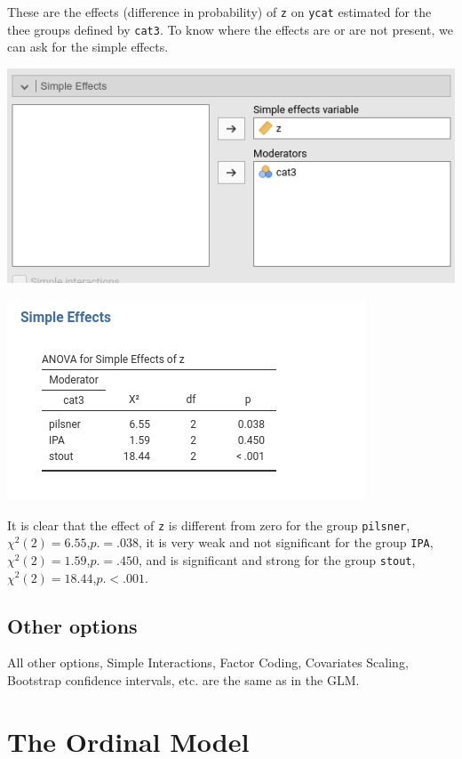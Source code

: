 \documentclass[
]{book}
\begin{document}
These are the effects (difference in probability) of \texttt{z} on \texttt{ycat} estimated for the thee groups defined by \texttt{cat3}. To know where the effects are or are not present, we can ask for the simple effects.

\includegraphics{bookletpics/3_multi_input3.png}

\includegraphics{bookletpics/3_multi_output10.png}

It is clear that the effect of \texttt{z} is different from zero for the group \texttt{pilsner}, \(\chi^2(2)=6.55\),\(p.=.038\), it is very weak and not significant for the group \texttt{IPA}, \(\chi^2(2)=1.59\),\(p.=.450\), and is significant and strong for the group \texttt{stout}, \(\chi^2(2)=18.44\),\(p.<.001\).

\hypertarget{other-options-1}{%
\subsection{Other options}\label{other-options-1}}

All other options, {Simple Interactions}, {Factor Coding}, {Covariates Scaling}, {Bootstrap} confidence intervals, etc. are the same as in the GLM.

\hypertarget{ordinal}{%
\section{The Ordinal Model}\label{ordinal}}
\end{document}
